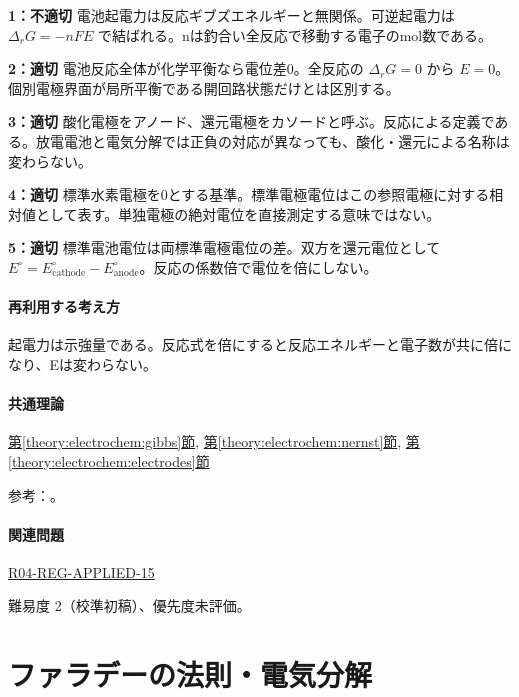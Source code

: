 \noindent\textbf{1：不適切} 電池起電力は反応ギブズエネルギーと無関係。可逆起電力は \(\Delta_rG=-nFE\) で結ばれる。nは釣合い全反応で移動する電子のmol数である。\par

\noindent\textbf{2：適切} 電池反応全体が化学平衡なら電位差0。全反応の \(\Delta_rG=0\) から \(E=0\)。個別電極界面が局所平衡である開回路状態だけとは区別する。\par

\noindent\textbf{3：適切} 酸化電極をアノード、還元電極をカソードと呼ぶ。反応による定義である。放電電池と電気分解では正負の対応が異なっても、酸化・還元による名称は変わらない。\par

\noindent\textbf{4：適切} 標準水素電極を0とする基準。標準電極電位はこの参照電極に対する相対値として表す。単独電極の絶対電位を直接測定する意味ではない。\par

\noindent\textbf{5：適切} 標準電池電位は両標準電極電位の差。双方を還元電位として \(E^\circ=E^\circ_{\mathrm{cathode}}-E^\circ_{\mathrm{anode}}\)。反応の係数倍で電位を倍にしない。\par

\paragraph{再利用する考え方} 起電力は示強量である。反応式を倍にすると反応エネルギーと電子数が共に倍になり、Eは変わらない。

\paragraph{共通理論} \hyperref[theory:electrochem:gibbs]{第\ref*{theory:electrochem:gibbs}節}, \hyperref[theory:electrochem:nernst]{第\ref*{theory:electrochem:nernst}節}, \hyperref[theory:electrochem:electrodes]{第\ref*{theory:electrochem:electrodes}節}

\par 参考：\cite{openstax_cell_gibbs,mit_redox2014}。

\paragraph{関連問題} \hyperref[q:r04-reg-applied-15]{R04-REG-APPLIED-15}

\par 難易度 2（校準初稿）、優先度未評価。

\section{ファラデーの法則・電気分解}

